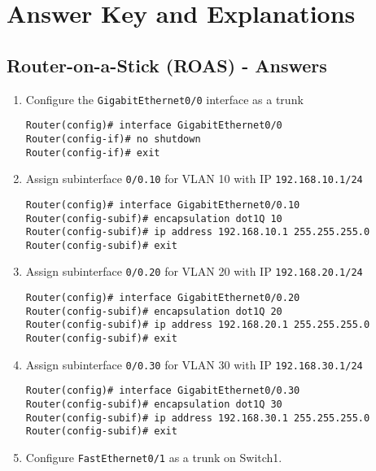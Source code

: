 \documentclass[a4paper]{book}
\begin{document}
\part{Answer Key and Explanations}


\chapter{Router-on-a-Stick (ROAS) - Answers}

\begin{enumerate}
\item{Configure the \texttt{GigabitEthernet0/0} interface as a trunk}

\begin{lstlisting}
Router(config)# interface GigabitEthernet0/0
Router(config-if)# no shutdown
Router(config-if)# exit
\end{lstlisting}

\item{Assign subinterface \texttt{0/0.10} for VLAN 10 with IP \texttt{192.168.10.1/24}}

\begin{lstlisting}
Router(config)# interface GigabitEthernet0/0.10
Router(config-subif)# encapsulation dot1Q 10
Router(config-subif)# ip address 192.168.10.1 255.255.255.0
Router(config-subif)# exit
\end{lstlisting}

\item{Assign subinterface \texttt{0/0.20} for VLAN 20 with IP \texttt{192.168.20.1/24}}

\begin{lstlisting}
Router(config)# interface GigabitEthernet0/0.20
Router(config-subif)# encapsulation dot1Q 20
Router(config-subif)# ip address 192.168.20.1 255.255.255.0
Router(config-subif)# exit
\end{lstlisting}

\item{Assign subinterface \texttt{0/0.30} for VLAN 30 with IP \texttt{192.168.30.1/24}}

\begin{lstlisting}
Router(config)# interface GigabitEthernet0/0.30
Router(config-subif)# encapsulation dot1Q 30
Router(config-subif)# ip address 192.168.30.1 255.255.255.0
Router(config-subif)# exit
\end{lstlisting}



\item{Configure \texttt{FastEthernet0/1} as a trunk on Switch1.}


\end{enumerate}
\end{document}
